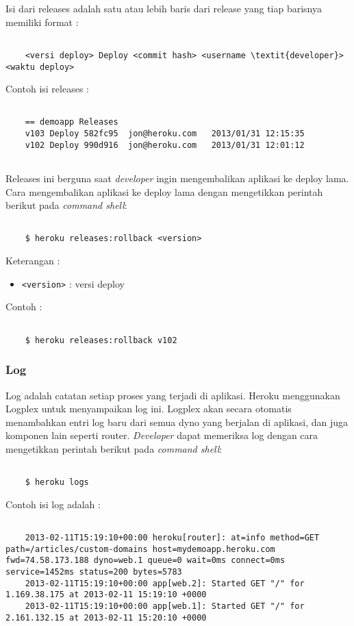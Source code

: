 Isi dari releases adalah satu atau lebih baris dari release yang tiap barisnya memiliki format : 
\begin{lstlisting}

	<versi deploy> Deploy <commit hash> <username \textit{developer}> <waktu deploy> 

\end{lstlisting}

Contoh isi releases :
\begin{lstlisting}

	== demoapp Releases
	v103 Deploy 582fc95  jon@heroku.com   2013/01/31 12:15:35
	v102 Deploy 990d916  jon@heroku.com   2013/01/31 12:01:12
	
\end{lstlisting}

Releases ini berguna saat \textit{developer} ingin mengembalikan aplikasi ke deploy lama. Cara mengembalikan aplikasi ke deploy lama dengan mengetikkan perintah berikut pada \textit{command shell}:
\begin{lstlisting}

	$ heroku releases:rollback <version>

\end{lstlisting}
Keterangan :
\begin{itemize}
\item \texttt{<version>} : versi deploy
\end{itemize}

Contoh :
\begin{lstlisting}

	$ heroku releases:rollback v102

\end{lstlisting}

\subsubsection{Log}
Log adalah catatan setiap proses yang terjadi di aplikasi. Heroku menggunakan Logplex untuk menyampaikan log ini. Logplex akan secara otomatis menambahkan entri log baru dari semua dyno yang berjalan di aplikasi, dan juga komponen lain seperti router. \textit{Developer} dapat memeriksa log dengan cara mengetikkan perintah berikut pada \textit{command shell}:
\begin{lstlisting}

	$ heroku logs

\end{lstlisting}

Contoh isi log adalah :
\begin{lstlisting}

	2013-02-11T15:19:10+00:00 heroku[router]: at=info method=GET path=/articles/custom-domains host=mydemoapp.heroku.com fwd=74.58.173.188 dyno=web.1 queue=0 wait=0ms connect=0ms service=1452ms status=200 bytes=5783
	2013-02-11T15:19:10+00:00 app[web.2]: Started GET "/" for 1.169.38.175 at 2013-02-11 15:19:10 +0000
	2013-02-11T15:19:10+00:00 app[web.1]: Started GET "/" for 2.161.132.15 at 2013-02-11 15:20:10 +0000

\end{lstlisting}

